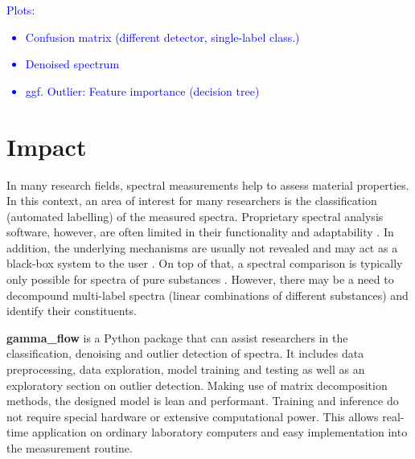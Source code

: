 \documentclass[preprint,12pt, a4paper]{elsarticle}
\begin{document}

\textcolor{blue}{
Plots: 
\begin{itemize}
	\item Confusion matrix (different detector, single-label class.)
	\item Denoised spectrum
	\item ggf. Outlier: Feature importance (decision tree)
\end{itemize}}


\section{Impact}
In many research fields, spectral measurements help to assess material properties. 
In this context, an area of interest for many researchers is the classification (automated labelling) of the measured spectra. Proprietary spectral analysis software, however, are often limited in their functionality and adaptability \cite{Lam2011, Nasereddin2023}. In addition, the underlying mechanisms are usually not revealed and may act as a black-box system to the user \cite{ElAmri2022}. On top of that, a spectral comparison is typically only possible for spectra of pure substances \cite{Cowger2021}. However, there may be a need to decompound multi-label spectra (linear combinations of different substances) and identify their constituents. 

\textbf{gamma\_flow} is a Python package that can assist researchers in the classification, denoising and outlier detection of spectra. It includes data preprocessing, data exploration, model training and testing as well as an exploratory section on outlier detection. Making use of matrix decomposition methods, the designed model is lean and performant. Training and inference do not require special hardware or extensive computational power. This allows real-time application on ordinary laboratory computers and easy implementation into the measurement routine. 
\end{document}

